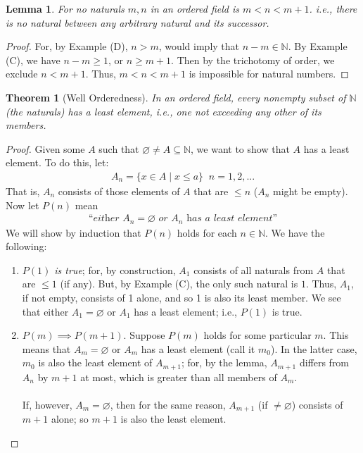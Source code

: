 \documentclass[12pt]{book}
\newcommand{\N}{\mathbb{N}}
\newtheorem{lemma}{Lemma}
\newtheorem{theorem}{Theorem}
\theoremstyle{definition}
\begin{document}
\begin{lemma}
For no naturals $m,n$ in an ordered field is $m<n<m+1$. i.e., there is no natural between any arbitrary natural and its successor. 
\end{lemma}
\begin{proof}
For, by Example (D), $n>m$, would imply that $n-m \in \N$. By Example (C), we have $n-m\geq 1$, or $n\geq m+1$. Then by the trichotomy of order, we exclude $n< m+1$. Thus, $m<n<m+1$ is impossible for natural numbers.   
\end{proof}
\begin{theorem}[Well Orderedness]
	In an ordered field, every nonempty subset of $\N$ (the naturals) has a least element, i.e., one not exceeding any other of its members. 
\end{theorem}
\begin{proof}
Given some $A$ such that $\varnothing \neq A \subseteq \N$, we want to show that $A$ has a least element. To do this, let:
\begin{align*}
		A_n = \{x\in A\;|\; x \leq a\}\;\; n=1,2, ...
\end{align*}
That is, $A_n$ consists of those elements of $A$ that are $\leq n$ ($A_n$ might be empty). Now let $P(n)$ mean
\begin{align*}
	\textit{``either $A_n = \varnothing$ or $A_n$ has a least element''}	
\end{align*}
We will show by induction that $P(n)$ holds for each $n \in \N$. We have the following:
\begin{enumerate}[label=(\roman*)]
	\item \textit{$P(1)$ is true}; for, by construction, $A_1$ consists of all naturals from $A$ that are $\leq 1$ (if any). But, by Example (C), the only such natural is $1$. Thus, $A_1$, if not empty, consists of 1 alone, and so 1 is also its least member. We see that either $A_1 = \varnothing$ or $A_1$ has a least element; i.e., $P(1)$ is true.
	\item $P(m) \implies P(m+1)$. Suppose $P(m)$ holds for some particular $m$. This means that $A_m = \varnothing$ or $A_m$ has a least element (call it $m_0$). In the latter case, $m_0$ is also the least element of $A_{m+1}$; for, by the lemma, $A_{m+1}$ differs from $A_n$ by $m+1$ at most, which is greater than all members of $A_m$.\\
		\\
		If, however, $A_m = \varnothing$, then for the same reason, $A_{m+1}$ (if $\neq \varnothing $) consists of $m+1$ alone; so $m+1$ is also the least element. \\

\end{enumerate}
\end{proof}
\end{document}
